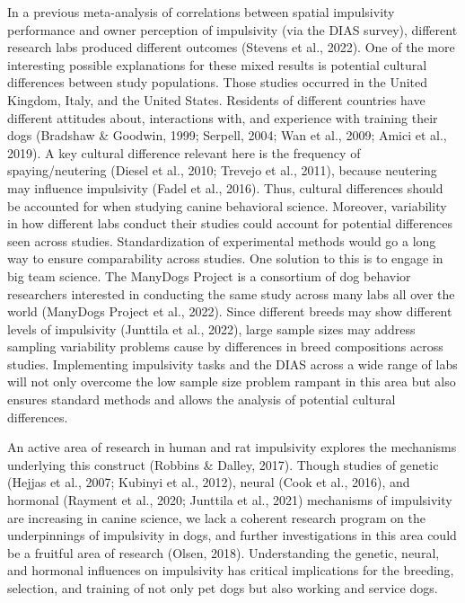 \documentclass[
  ,pub,floatsintext]{apa6}
\begin{document}
In a previous meta-analysis of correlations between spatial impulsivity performance and owner perception of impulsivity (via the DIAS survey), different research labs produced different outcomes (Stevens et al., 2022). One of the more interesting possible explanations for these mixed results is potential cultural differences between study populations. Those studies occurred in the United Kingdom, Italy, and the United States. Residents of different countries have different attitudes about, interactions with, and experience with training their dogs (Bradshaw \& Goodwin, 1999; Serpell, 2004; Wan et al., 2009; Amici et al., 2019). A key cultural difference relevant here is the frequency of spaying/neutering (Diesel et al., 2010; Trevejo et al., 2011), because neutering may influence impulsivity (Fadel et al., 2016). Thus, cultural differences should be accounted for when studying canine behavioral science. Moreover, variability in how different labs conduct their studies could account for potential differences seen across studies. Standardization of experimental methods would go a long way to ensure comparability across studies. One solution to this is to engage in big team science. The ManyDogs Project is a consortium of dog behavior researchers interested in conducting the same study across many labs all over the world (ManyDogs Project et al., 2022). Since different breeds may show different levels of impulsivity (Junttila et al., 2022), large sample sizes may address sampling variability problems cause by differences in breed compositions across studies. Implementing impulsivity tasks and the DIAS across a wide range of labs will not only overcome the low sample size problem rampant in this area but also ensures standard methods and allows the analysis of potential cultural differences.

An active area of research in human and rat impulsivity explores the mechanisms underlying this construct (Robbins \& Dalley, 2017). Though studies of genetic (Hejjas et al., 2007; Kubinyi et al., 2012), neural (Cook et al., 2016), and hormonal (Rayment et al., 2020; Junttila et al., 2021) mechanisms of impulsivity are increasing in canine science, we lack a coherent research program on the underpinnings of impulsivity in dogs, and further investigations in this area could be a fruitful area of research (Olsen, 2018). Understanding the genetic, neural, and hormonal influences on impulsivity has critical implications for the breeding, selection, and training of not only pet dogs but also working and service dogs.
\end{document}
